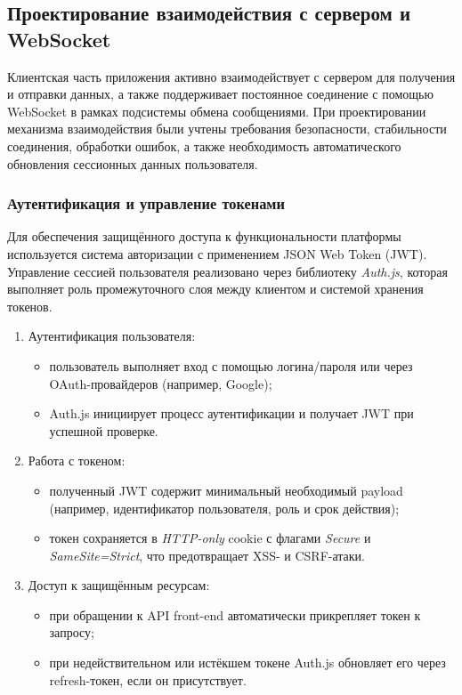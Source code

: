 \subsection{Проектирование взаимодействия с сервером и WebSocket}

Клиентская часть приложения активно взаимодействует с сервером для получения и отправки данных, а также поддерживает постоянное соединение с помощью WebSocket в рамках подсистемы обмена сообщениями. При проектировании механизма взаимодействия были учтены требования безопасности, стабильности соединения, обработки ошибок, а также необходимость автоматического обновления сессионных данных пользователя.

\subsubsection{Аутентификация и управление токенами}
Для обеспечения защищённого доступа к функциональности платформы используется система авторизации с применением JSON Web Token (JWT). Управление сессией пользователя реализовано через библиотеку \textit{Auth.js}, которая выполняет роль промежуточного слоя между клиентом и системой хранения токенов.

\begin{enumerate}
  \item Аутентификация пользователя:
  \begin{itemize}
    \item пользователь выполняет вход с помощью логина/пароля или через OAuth-провайдеров (например, Google);
    \item Auth.js инициирует процесс аутентификации и получает JWT при успешной проверке.
  \end{itemize}
  
  \item Работа с токеном:
  \begin{itemize}
    \item полученный JWT содержит минимальный необходимый payload (например, идентификатор пользователя, роль и срок действия);
    \item токен сохраняется в \textit{HTTP-only} cookie с флагами \textit{Secure} и \textit{SameSite=Strict}, что предотвращает XSS- и CSRF-атаки.
  \end{itemize}
  
  \item Доступ к защищённым ресурсам:
  \begin{itemize}
    \item при обращении к API front-end автоматически прикрепляет токен к запросу;
    \item при недействительном или истёкшем токене Auth.js обновляет его через refresh-токен, если он присутствует.
  \end{itemize}
\end{enumerate}

